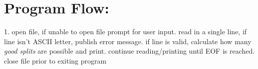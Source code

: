 \documentclass[12pt]{article}
\begin{document}
\newline


\section{Program Flow:}\label{Program Flow}
1. open file, if unable to open file prompt for user input. read in a single line, if line isn't ASCII letter, publish error message. if line is valid, calculate how many \textit{good splits} are possible and print. continue reading/printing until EOF is reached. close file prior to exiting program\newline
\newline
\end{document}
